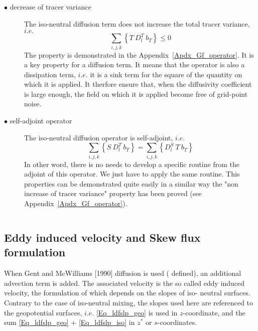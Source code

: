 \documentclass[NEMO_book]{subfiles}
\begin{document}
\begin{description}
\item[$\bullet$ decrease of tracer variance] The iso-neutral diffusion term does 
not increase the total tracer variance, $i.e.$
\begin{equation} \label{Gf_property1}
\sum_{i,j,k} \left\{ T \ D_l^T \ b_T \right\} \leq 0
\end{equation}
The property is demonstrated in the Appendix~\ref{Apdx_Gf_operator}. It is a 
key property for a diffusion term. It means that the operator is also a dissipation 
term, $i.e.$ it is a sink term for the square of the quantity on which it is applied. 
It therfore ensure that, when the diffusivity coefficient is large enough, the field 
on which it is applied become free of grid-point noise.

\item[$\bullet$ self-adjoint operator] The iso-neutral diffusion operator is self-adjoint, 
$i.e.$
\begin{equation} \label{Gf_property1}
\sum_{i,j,k} \left\{ S \ D_l^T \ b_T \right\} = \sum_{i,j,k} \left\{ D_l^S \ T \ b_T \right\} 
\end{equation}
In other word, there is no needs to develop a specific routine from the adjoint of this 
operator. We just have to apply the same routine. This properties can be demonstrated 
quite easily in a similar way the "non increase of tracer variance" property has been 
proved (see Appendix~\ref{Apdx_Gf_operator}).
\end{description}


$\ $\newline      %
\subsection{ Eddy induced velocity and Skew flux formulation}

When Gent and McWilliams [1990] diffusion is used ( defined), 
an additional advection term is added. The associated velocity is the so called 
eddy induced velocity, the formulation of which depends on the slopes of iso-
neutral surfaces. Contrary to the case of iso-neutral mixing, the slopes used 
here are referenced to the geopotential surfaces, $i.e.$ \eqref{Eq_ldfslp_geo} 
is used in $z$-coordinate, and the sum \eqref{Eq_ldfslp_geo}
+ \eqref{Eq_ldfslp_iso} in $z^*$ or $s$-coordinates. 
\end{document}

